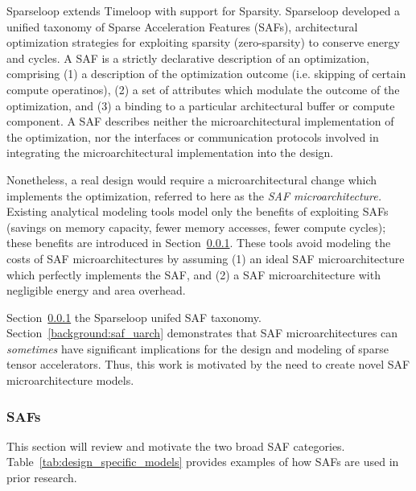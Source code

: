 Sparseloop\cite{sparseloop} extends Timeloop with support for Sparsity. Sparseloop developed a unified taxonomy of Sparse Acceleration Features (SAFs), architectural optimization strategies for exploiting sparsity (zero-sparsity) to conserve energy and cycles. A SAF is a strictly declarative description of an optimization, comprising (1) a description of the optimization outcome (i.e. skipping of certain compute operatinos), (2) a set of attributes which modulate the outcome of the optimization, and (3) a binding to a particular architectural buffer or compute component. A SAF describes neither the microarchitectural implementation of the optimization, nor the interfaces or communication protocols involved in integrating the microarchitectural implementation into the design. 

Nonetheless, a real design would require a microarchitectural change which implements the optimization, referred to here as the \textit{SAF microarchitecture.} Existing analytical modeling tools\cite{sparseloop} model only the benefits of exploiting SAFs (savings on memory capacity, fewer memory accesses, fewer compute cycles); these benefits are introduced in Section~\ref{background:safs}. These tools avoid modeling the costs of SAF microarchitectures by assuming (1) an ideal SAF microarchitecture which perfectly implements the SAF, and (2) a SAF microarchitecture with negligible energy and area overhead.

Section~\ref{background:safs} the Sparseloop unifed SAF taxonomy. Section~\ref{background:saf_uarch} demonstrates that SAF microarchitectures can \textit{sometimes} have significant implications for the design and modeling of sparse tensor accelerators. Thus, this work is motivated by the need to create novel SAF microarchitecture models.

%
%
\subsubsection{SAFs}
\label{background:safs}

This section will review and motivate the two broad SAF categories. Table~\ref{tab:design_specific_models} provides examples of how SAFs are used in prior research.

